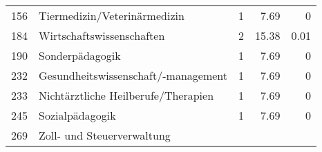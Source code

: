 \begin{longtable}{lXrrr}
     156 &
     \multicolumn{1}{X}{ Tiermedizin/Veterinärmedizin   } &


       \num{1} &
       \num[round-mode=places,round-precision=2]{7.69} &
         \num[round-mode=places,round-precision=2]{0} \\

     184 &
     \multicolumn{1}{X}{ Wirtschaftswissenschaften   } &


       \num{2} &
       \num[round-mode=places,round-precision=2]{15.38} &
         \num[round-mode=places,round-precision=2]{0.01} \\

     190 &
     \multicolumn{1}{X}{ Sonderpädagogik   } &


       \num{1} &
       \num[round-mode=places,round-precision=2]{7.69} &
         \num[round-mode=places,round-precision=2]{0} \\

     232 &
     \multicolumn{1}{X}{ Gesundheitswissenschaft/-management   } &


       \num{1} &
       \num[round-mode=places,round-precision=2]{7.69} &
         \num[round-mode=places,round-precision=2]{0} \\

     233 &
     \multicolumn{1}{X}{ Nichtärztliche Heilberufe/Therapien   } &


       \num{1} &
       \num[round-mode=places,round-precision=2]{7.69} &
         \num[round-mode=places,round-precision=2]{0} \\

     245 &
     \multicolumn{1}{X}{ Sozialpädagogik   } &


       \num{1} &
       \num[round-mode=places,round-precision=2]{7.69} &
         \num[round-mode=places,round-precision=2]{0} \\

     269 &
     \multicolumn{1}{X}{ Zoll- und Steuerverwaltung   } &



\end{longtable}
